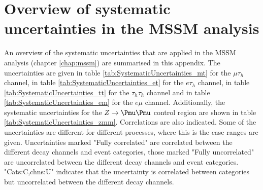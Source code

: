 \appendix
\chapter{\texorpdfstring{Overview of systematic uncertainties in the MSSM \AHtotautau analysis}{Overview of systematic uncertainties in the MSSM A/H to tautau analysis}}
\label{appendix:uncerts}
An overview of the systematic uncertainties that are applied in the MSSM \AHtotautau analysis (chapter \ref{chap:mssm})
are summarised in this appendix. The uncertainties are given in
table \ref{tab:SystematicUncertainties_mt} for the $\mu\tau_h$
channel, in table \ref{tab:SystematicUncertainties_et} for the $e\tau_h$ channel,
in table \ref{tab:SystematicUncertainties_tt} for the $\tau_h\tau_h$ channel and
in table \ref{tab:SystematicUncertainties_em} for the $e\mu$ channel. Additionally,
the systematic uncertainties for the $Z\rightarrow\mumu$ control region are shown
in table \ref{tab:SystematicUncertainties_zmm}. Correlations are also indicated.
Some of the uncertainties
are different for different processes, where this is the case ranges are given.
Uncertainties marked "Fully correlated" are correlated between the different
decay channels and event categories, those marked "Fully uncorrelated" are
uncorrelated between the different decay channels and event categories. "Cats:C,chns:U"
indicates that the uncertainty is correlated between categories but uncorrelated between
the different decay channels.




